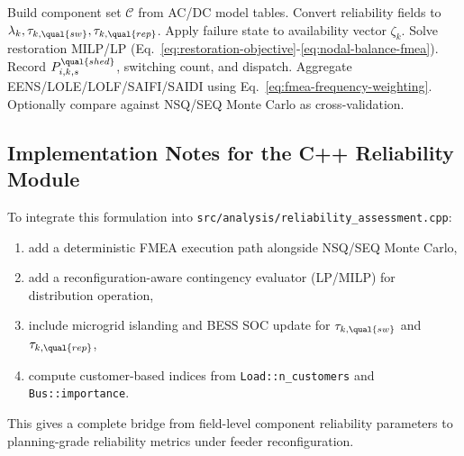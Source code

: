 \begin{algorithmic}[1]
\State Build component set \(\mathcal{C}\) from AC/DC model tables.
\State Convert reliability fields to \(\lambda_k,\tau_{k,\qual{sw}},\tau_{k,\qual{rep}}\).
    \State Apply failure state to availability vector \(\zeta_{k}\).
    \State Solve restoration MILP/LP (Eq.\ \ref{eq:restoration-objective}-\ref{eq:nodal-balance-fmea}).
    \State Record \(P^{\qual{shed}}_{i,k,s}\), switching count, and dispatch.
  \EndFor
\EndFor
\State Aggregate EENS/LOLE/LOLF/SAIFI/SAIDI using Eq.\ \ref{eq:fmea-frequency-weighting}.
\State Optionally compare against NSQ/SEQ Monte Carlo as cross-validation.
\end{algorithmic}

\subsection{Implementation Notes for the C++ Reliability Module}

To integrate this formulation into
\texttt{src/analysis/reliability\_assessment.cpp}:
\begin{enumerate}
  \item add a deterministic FMEA execution path alongside NSQ/SEQ Monte Carlo,
  \item add a reconfiguration-aware contingency evaluator (LP/MILP) for
        distribution operation,
  \item include microgrid islanding and BESS SOC update for
        \(\tau_{k,\qual{sw}}\) and \(\tau_{k,\qual{rep}}\),
  \item compute customer-based indices from \texttt{Load::n\_customers} and
        \texttt{Bus::importance}.
\end{enumerate}

This gives a complete bridge from field-level component reliability parameters
to planning-grade reliability metrics under feeder reconfiguration.
